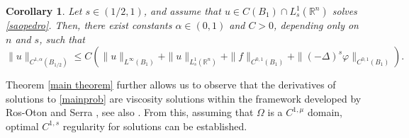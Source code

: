 \documentclass[reqno,11pt]{amsart}
\newtheorem{corollary}{Corollary}[section]
\numberwithin{equation}{section}
\numberwithin{equation}{section}
\begin{document}
\begin{corollary}
Let $s \in (1/2,1)$, and assume that $u \in C(B_1) \cap L^1_s(\mathbb{R}^n)$ solves \eqref{saopedro}. Then, there exist constants $\alpha \in (0,1)$ and $C > 0$, depending only on $n$ and $s$, such that
$$
\|u\|_{C^{1,\alpha}(B_{1/2})} \leq C(\|u\|_{L^\infty(B_1)} +  \|u\|_{L^1_s(\mathbb{R}^n)} + \|f\|_{C^{0,1}(B_1)} + \|(-\Delta)^s \varphi\|_{C^{0,1}(B_1)}).
$$
\end{corollary}


Theorem \ref{main theorem} further allows us to observe that the derivatives of solutions to \eqref{mainprob} are viscosity solutions within the framework developed by Ros-Oton and Serra \cite{ROS17}, see also \cite{ARO20, RO16}. From this, assuming that $\Omega$ is a $C^{1,\mu}$ domain, optimal $C^{1,s}$ regularity for solutions can be established.




\end{document}
